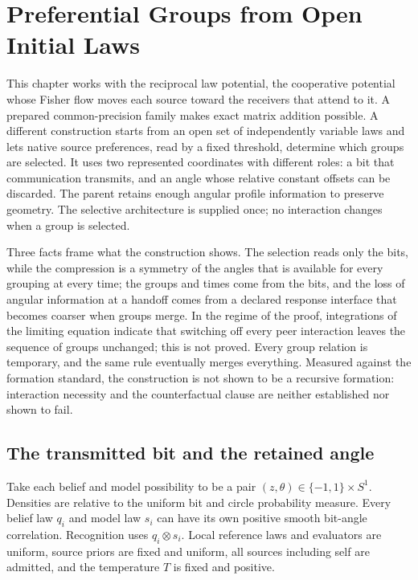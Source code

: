 \chapter{Preferential Groups from Open Initial Laws}
\label{cf:open-formation}

This chapter works with the reciprocal law potential, the cooperative potential whose Fisher flow moves each source toward the receivers that attend to it. A prepared common-precision family makes exact matrix addition possible. A different construction starts from an open set of independently variable laws and lets native source preferences, read by a fixed threshold, determine which groups are selected. It uses two represented coordinates with different roles: a bit that communication transmits, and an angle whose relative constant offsets can be discarded. The parent retains enough angular profile information to preserve geometry. The selective architecture is supplied once; no interaction changes when a group is selected.

Three facts frame what the construction shows. The selection reads only the bits, while the compression is a symmetry of the angles that is available for every grouping at every time; the groups and times come from the bits, and the loss of angular information at a handoff comes from a declared response interface that becomes coarser when groups merge. In the regime of the proof, integrations of the limiting equation indicate that switching off every peer interaction leaves the sequence of groups unchanged; this is not proved. Every group relation is temporary, and the same rule eventually merges everything. Measured against the formation standard, the construction is not shown to be a recursive formation: interaction necessity and the counterfactual clause are neither established nor shown to fail.

\section{The transmitted bit and the retained angle}

Take each belief and model possibility to be a pair $(z,\theta)\in\{-1,1\}\times S^1$. Densities are relative to the uniform bit and circle probability measure. Every belief law $q_i$ and model law $s_i$ can have its own positive smooth bit-angle correlation. Recognition uses $q_i\otimes s_i$. Local reference laws and evaluators are uniform, source priors are fixed and uniform, all sources including self are admitted, and the temperature $T$ is fixed and positive.

